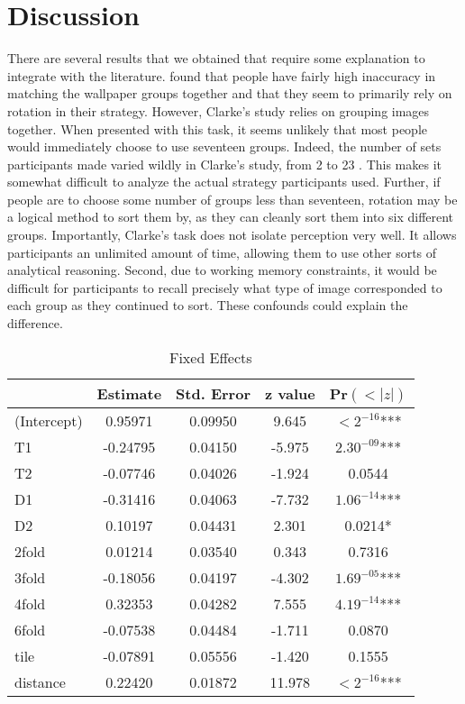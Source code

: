 \section{Discussion}
There are several results that we obtained that require some explanation to integrate with the literature. \citet{clarke} found that people have fairly high inaccuracy in matching the wallpaper groups together and that they seem to primarily rely on rotation in their strategy. However, Clarke's study relies on grouping images together. When presented with this task, it seems unlikely that most people would immediately choose to use seventeen groups. Indeed, the number of sets participants made varied wildly in Clarke's study, from 2 to 23 \citep{clarke}. This makes it somewhat difficult to analyze the actual strategy participants used. Further, if people are to choose some number of groups less than seventeen, rotation may be a logical method to sort them by, as they can cleanly sort them into six different groups. Importantly, Clarke's task does not isolate perception very well. It allows participants an unlimited amount of time, allowing them to use other sorts of analytical reasoning. Second, due to working memory constraints, it would be difficult for participants to recall precisely what type of image corresponded to each group as they continued to sort. These confounds could explain the difference.

\begin{table}
\centering
\begin{tabular}{|l|cccc|}
\hline
& Estimate & Std. Error & z value & Pr$(<|z|)$  \\ \hline
(Intercept) & 0.95971 &  0.09950 & 9.645 & $<2^{-16}$*** \\ \hline
T1 & -0.24795 &  0.04150 & -5.975 & $2.30^{-09}$*** \\ \hline
T2 & -0.07746 & 0.04026 & -1.924 & 0.0544 \\ \hline
D1 & -0.31416 & 0.04063 & -7.732 & $1.06^{-14}$*** \\ \hline
D2 & 0.10197 & 0.04431 & 2.301 & 0.0214* \\ \hline
2fold & 0.01214 & 0.03540 & 0.343 & 0.7316 \\ \hline
3fold & -0.18056 & 0.04197 & -4.302 & $1.69^{-05}$*** \\ \hline
4fold & 0.32353 & 0.04282 & 7.555 & $4.19^{-14}$*** \\ \hline
6fold & -0.07538 & 0.04484 & -1.711 & 0.0870 \\ \hline
tile & -0.07891 & 0.05556 & -1.420 & 0.1555 \\ \hline
distance & 0.22420 & 0.01872 & 11.978 & $<2^{-16}$*** \\ \hline
\end{tabular}
\label{fixeff}
\caption{Fixed Effects}
\end{table}

